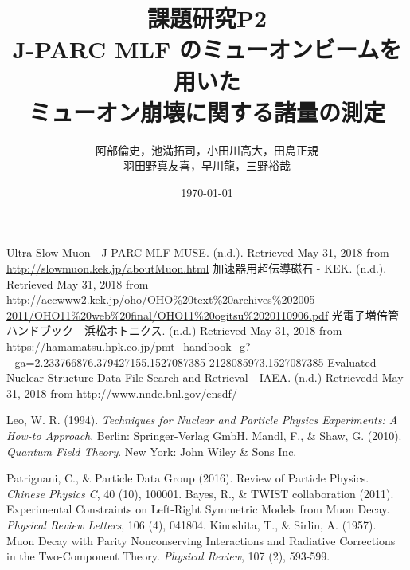 \documentclass[titlepage]{jsarticle}
\begin{document}
\title{課題研究P2\\J-PARC MLF  のミューオンビームを用いた\\ミューオン崩壊に関する諸量の測定}
\author{阿部倫史，池満拓司，小田川高大，田島正規\\羽田野真友喜，早川龍，三野裕哉}
\date{\today}
\maketitle
\tableofcontents
\newpage
%









\newpage
\appendix


\begin{thebibliography}{99}
 Ultra Slow Muon - J-PARC MLF MUSE. (n.d.). Retrieved May 31, 2018
  from \url{http://slowmuon.kek.jp/aboutMuon.html}
 加速器用超伝導磁石 - KEK. (n.d.). Retrieved May 31, 2018
  from \url{http://accwww2.kek.jp/oho/OHO\%20text\%20archives\%202005-2011/OHO11\%20web\%20final/OHO11\%20ogitsu\%2020110906.pdf}
 光電子増倍管ハンドブック - 浜松ホトニクス. (n.d.) Retrieved May 31, 2018
  from \url{https://hamamatsu.hpk.co.jp/pmt_handbook_g?\_ga=2.233766876.379427155.1527087385-2128085973.1527087385}
 Evaluated Nuclear Structure Data File Search and Retrieval - IAEA. (n.d.) Retrievedd May 31, 2018
  from \url{http://www.nndc.bnl.gov/ensdf/}
  
 Leo, W. R. (1994). \textit{Techniques for Nuclear and Particle Physics Experiments: A How-to Approach}. Berlin: Springer-Verlag GmbH.
 Mandl, F., \& Shaw, G. (2010). \textit{Quantum Field Theory}. New York: John Wiley \& Sons Inc.

 Patrignani, C., \&  Particle Data Group (2016). Review of Particle Physics. \textit{Chinese Physics C}, 40 (10), 100001.
 Bayes, R., \& TWIST collaboration (2011). Experimental Constraints on Left-Right Symmetric Models from Muon Decay. \textit{Physical Review Letters}, 106 (4), 041804.
 Kinoshita, T., \& Sirlin, A. (1957). Muon Decay with Parity Nonconserving Interactions and Radiative Corrections in the Two-Component Theory. \textit{Physical Review}, 107 (2), 593-599.

\end{thebibliography} 
\end{document}
